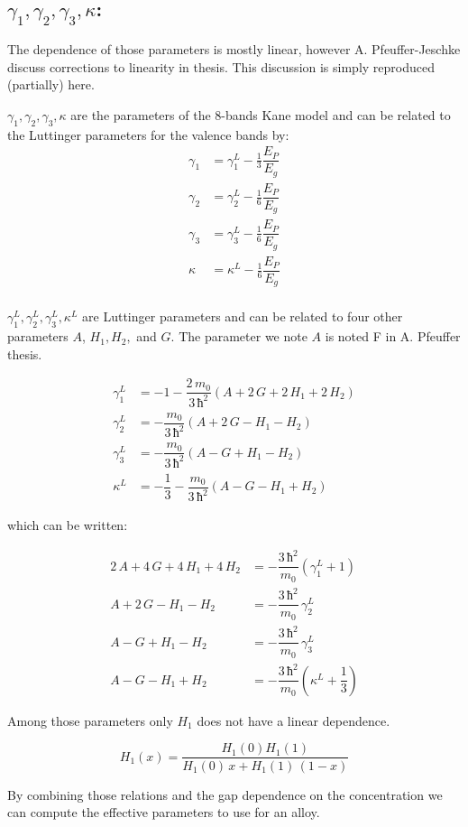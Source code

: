 \documentclass[prb,aps]{revtex4}
\begin{document}
    \subsection{$γ_1, γ_2, γ_3, κ$:}

        The dependence of those parameters is mostly linear, however A. Pfeuffer-Jeschke discuss corrections to linearity in thesis. This discussion is simply reproduced (partially) here.

        $γ_1, γ_2, γ_3, κ$ are the parameters of the 8-bands Kane model and can be related to the Luttinger parameters for the valence bands by:
        \begin{align}
            γ_1 &= γ_1^L - \frac13 \dfrac{E_P}{E_g}\\
            γ_2 &= γ_2^L - \frac16 \dfrac{E_P}{E_g}\\
            γ_3 &= γ_3^L - \frac16 \dfrac{E_P}{E_g}\\
            κ &= κ^L - \frac16 \dfrac{E_P}{E_g}\\
        \end{align}

        $γ_1^L, γ_2^L, γ_3^L, κ^L$ are Luttinger parameters and can be related to four other parameters $A$, $H_1, H_2,$ and $G$. The parameter we note $A$ is noted F in A. Pfeuffer thesis.

        \begin{align}
            γ_1^L &= - 1 - \dfrac{2\,m_0}{3\,ħ^2}\left(A + 2\,G + 2\,H_1 + 2\,H_2 \right)\\
            γ_2^L &= - \dfrac{m_0}{3\,ħ^2}\left( A + 2\,G - H_1 - H_2 \right)\\
            γ_3^L &= - \dfrac{m_0}{3\,ħ^2}\left( A - G + H_1 - H_2 \right)\\
            κ^L &= - \dfrac{1}{3} - \dfrac{m_0}{3\,ħ^2}\left( A - G - H_1 + H_2 \right)
        \end{align}

        which can be written:

        \begin{align}
            2\,A + 4\,G + 4\,H_1 + 4\,H_2 &= -\dfrac{3\,ħ^2}{m_0} \left( γ_1^L + 1 \right)\\
            A + 2\,G - H_1 - H_2 &= - \dfrac{3\,ħ^2}{m_0}\,γ_2^L\\
            A - G + H_1 - H_2 &= - \dfrac{3\,ħ^2}{m_0}\,γ_3^L\\
            A - G - H_1 + H_2 &= - \dfrac{3\,ħ^2}{m_0}\left( κ^L + \dfrac{1}{3} \right)
        \end{align}

        Among those parameters only $H_1$ does not have a linear dependence.

        \begin{equation}
            H_1(x) = \dfrac{H_1(0)H_1(1)}{H_1(0)\,x + H_1(1)\,(1-x)}
        \end{equation}

        By combining those relations and the gap dependence on the concentration we can compute the effective parameters to use for an alloy.
\end{document}
